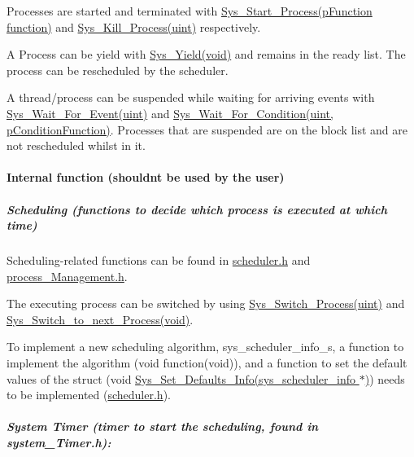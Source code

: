 \begin{DoxyEnumerate}
\item Processes are started and terminated with \hyperlink{process__Management_8h_a0833f904557c4c9b39b4cf5c1e43586f}{Sys\+\_\+\+Start\+\_\+\+Process(p\+Function function)} and \hyperlink{process__Management_8h_a6d95b14e319ffff426fc04025d22ac68}{Sys\+\_\+\+Kill\+\_\+\+Process(uint)} respectively.
\item A Process can be yield with \hyperlink{process__Management_8h_afea22f7c15161f12a5b108b3795da332}{Sys\+\_\+\+Yield(void)} and remains in the ready list. The process can be rescheduled by the scheduler.
\item A thread/process can be suspended while waiting for arriving events with \hyperlink{process__Management_8h_a4b45be80626e64bb659b16e5dabcfc1d}{Sys\+\_\+\+Wait\+\_\+\+For\+\_\+\+Event(uint)} and \hyperlink{process__Management_8h_ade99052670becc704e8f0cf153bb844f}{Sys\+\_\+\+Wait\+\_\+\+For\+\_\+\+Condition(uint, p\+Condition\+Function)}. Processes that are suspended are on the block list and are not rescheduled whilst in it. 
\end{DoxyEnumerate}\hypertarget{group__process_process_internal}{}\paragraph{Internal function (shouldn\textquotesingle{}t be used by the user)}\label{group__process_process_internal}
\hypertarget{group__process_process_scheduling}{}\subparagraph{Scheduling (functions to decide which process is executed at which time)}\label{group__process_process_scheduling}
Scheduling-\/related functions can be found in \hyperlink{scheduler_8h}{scheduler.\+h} and \hyperlink{process__Management_8h}{process\+\_\+\+Management.\+h}.
\begin{DoxyItemize}
\item The executing process can be switched by using \hyperlink{process__Management_8h_a5434c0bfa037779752d41518b1886f6b}{Sys\+\_\+\+Switch\+\_\+\+Process(uint)} and \hyperlink{process__Management_8h_aed6f39a867fac05effd63289b304ced1}{Sys\+\_\+\+Switch\+\_\+to\+\_\+next\+\_\+\+Process(void)}.
\item To implement a new scheduling algorithm, sys\+\_\+scheduler\+\_\+info\+\_\+s, a function to implement the algorithm (void function(void)), and a function to set the default values of the struct (void \hyperlink{scheduler_8h_a8992c7e866ac510c5db6ac1f1b00f324}{Sys\+\_\+\+Set\+\_\+\+Defaults\+\_\+\+Info(sys\+\_\+scheduler\+\_\+info $\ast$)}) needs to be implemented (\hyperlink{scheduler_8h}{scheduler.\+h}). 
\end{DoxyItemize}\hypertarget{group__process_process_timer}{}\subparagraph{System Timer (timer to start the scheduling, found in system\+\_\+\+Timer.\+h)\+:}\label{group__process_process_timer}

